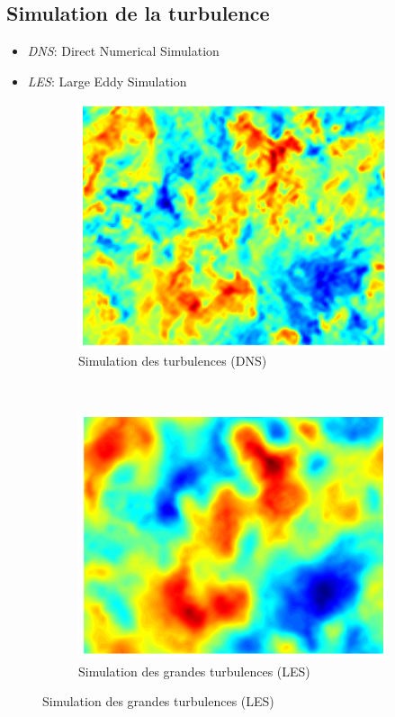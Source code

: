 \documentclass{beamer}
\begin{document}
\subsection{Simulation de la turbulence}
\begin{frame}
  \begin{itemize}
  \item \textit{DNS}: Direct Numerical Simulation
  \item \textit{LES}: Large Eddy Simulation
  \end{itemize}

  \begin{figure}[ht]
  \centering
  \begin{subfigure}[b]{0.5\textwidth}
    \centering
    \includegraphics[scale=0.25]{figures/DNS_Velocity_Field.png}
    \caption{\label{fig:dns} Simulation des turbulences (DNS)}
  \end{subfigure}%
  ~
  \begin{subfigure}[b]{0.5\textwidth}
    \centering
    \includegraphics[scale=0.25]{figures/DNS_Filtered_Velocity_Field_Large.png}
    \caption{\label{fig:les} Simulation des grandes turbulences (LES)}
  \end{subfigure}
\end{figure}
\end{frame}
\end{document}
